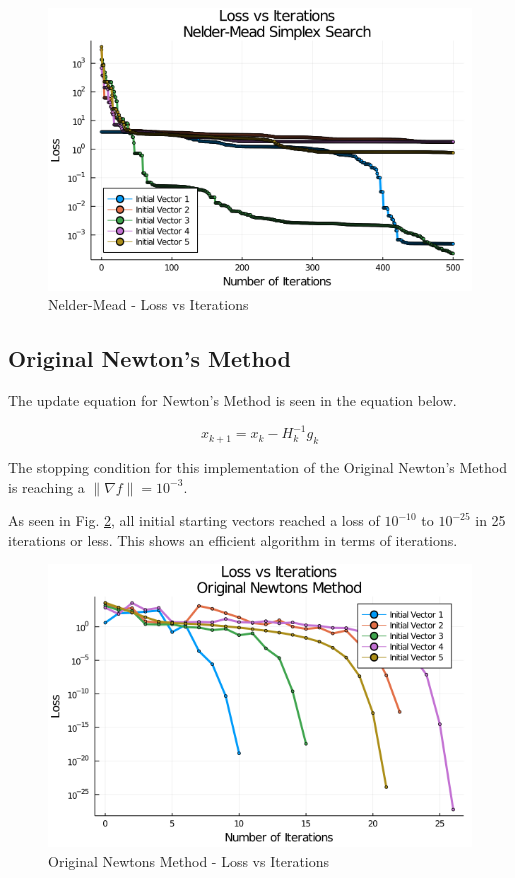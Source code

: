 \documentclass{article}
\begin{document}
    \begin{figure}[H]
        \centering
        \includegraphics[width=0.5\linewidth]{./NelderMead_LossPlot.png}
        \caption{Nelder-Mead - Loss vs Iterations}
        \label{fig:NelderMead_LossPlot.png}
    \end{figure}

    \subsection{Original Newton's Method}

    The update equation for Newton's Method is seen in the equation below.

    \begin{equation}
        x_{k+1} = x_k - H_k^{-1} g_k
    \end{equation}

    The stopping condition for this implementation of the Original Newton's Method is reaching a  $\| \nabla f \| = 10^{-3}$.

    As seen in Fig. \ref{fig:OriginalNewtonsMethod_LossPlot.png}, all initial starting vectors reached a loss of $10^{-10}$ to $10^{-25}$ in 25 iterations or less. This shows an efficient algorithm in terms of iterations.

    \begin{figure}[H]
        \centering
        \includegraphics[width=0.5\linewidth]{./OriginalNewtonsMethod_LossPlot.png}
        \caption{Original Newtons Method - Loss vs Iterations}
        \label{fig:OriginalNewtonsMethod_LossPlot.png}
    \end{figure}
\end{document}
